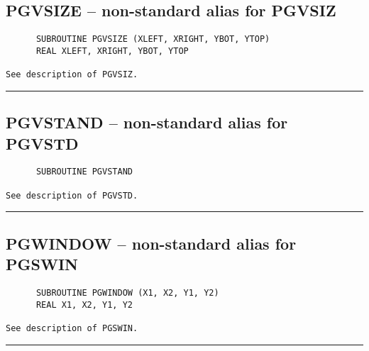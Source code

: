 {\subsection*{PGVSIZE -- non-standard alias for PGVSIZ }
\begin{verbatim}
      SUBROUTINE PGVSIZE (XLEFT, XRIGHT, YBOT, YTOP)
      REAL XLEFT, XRIGHT, YBOT, YTOP

See description of PGVSIZ.
\end{verbatim}
\hrule


\subsection*{PGVSTAND -- non-standard alias for PGVSTD }
\begin{verbatim}
      SUBROUTINE PGVSTAND

See description of PGVSTD.
\end{verbatim}
\hrule


\subsection*{PGWINDOW -- non-standard alias for PGSWIN }
\begin{verbatim}
      SUBROUTINE PGWINDOW (X1, X2, Y1, Y2)
      REAL X1, X2, Y1, Y2

See description of PGSWIN.
\end{verbatim}
\hrule
}


